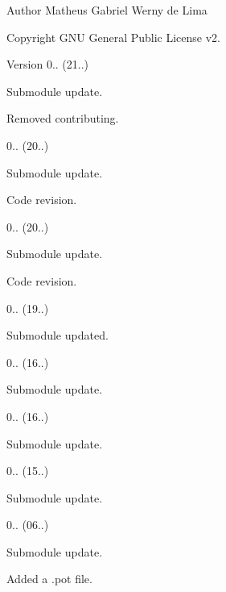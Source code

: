 \begin{DoxyAuthor}{Author}
Matheus Gabriel Werny de Lima 
\end{DoxyAuthor}
\begin{DoxyCopyright}{Copyright}
G\+NU General Public License v2. 
\end{DoxyCopyright}
\begin{DoxyVersion}{Version}
0.. (21..)
\begin{DoxyItemize}
\item Submodule update.
\item Removed contributing. 
\end{DoxyItemize}

0.. (20..)
\begin{DoxyItemize}
\item Submodule update.
\item Code revision. 
\end{DoxyItemize}

0.. (20..)
\begin{DoxyItemize}
\item Submodule update.
\item Code revision. 
\end{DoxyItemize}

0.. (19..)
\begin{DoxyItemize}
\item Submodule updated. 
\end{DoxyItemize}

0.. (16..)
\begin{DoxyItemize}
\item Submodule update. 
\end{DoxyItemize}

0.. (16..)
\begin{DoxyItemize}
\item Submodule update. 
\end{DoxyItemize}

0.. (15..)
\begin{DoxyItemize}
\item Submodule update. 
\end{DoxyItemize}

0.. (06..)
\begin{DoxyItemize}
\item Submodule update.
\item Added a .pot file. 
\end{DoxyItemize}


\end{DoxyVersion}
